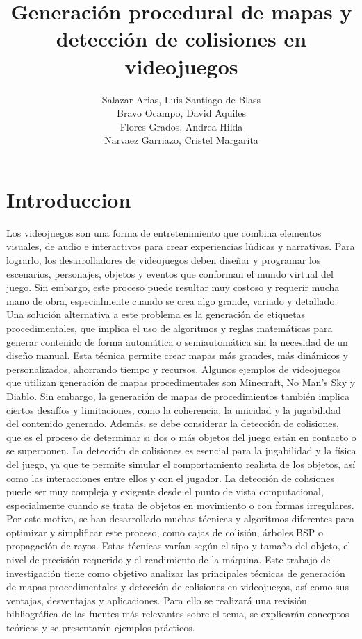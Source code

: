 \documentclass[stu, 12pt, letterpaper, donotrepeattitle, floatsintext, natbib]{apa7}
\title{\Large Generación procedural de mapas y detección de colisiones en videojuegos}
\author{Salazar Arias, Luis Santiago de Blass \\Bravo Ocampo, David Aquiles \\ Flores Grados, Andrea Hilda\\ Narvaez Garriazo, Cristel Margarita} %
\affiliation{\Huge\textbf{Universidad San Ignacio de Loyola}}
\begin{document}
\maketitle


\renewcommand\contentsname{\largeÍndice}
\tableofcontents
\setcounter{tocdepth}{2}
\newpage
\renewcommand{\listfigurename}{\largeÍndice de fíguras}
\listoffigures
\newpage
\renewcommand{\listtablename}{\largeÍndice de tablas}
\listoftables
\newpage


\section{\large Introduccion}
Los videojuegos son una forma de entretenimiento que combina elementos visuales, de audio e 
interactivos para crear experiencias lúdicas y narrativas. Para lograrlo, los desarrolladores de 
videojuegos deben diseñar y programar los escenarios, personajes, objetos y eventos que 
conforman el mundo virtual del juego. Sin embargo, este proceso puede resultar muy costoso y 
requerir mucha mano de obra, especialmente cuando se crea algo grande, variado y detallado. 
Una solución alternativa a este problema es la generación de etiquetas procedimentales, que 
implica el uso de algoritmos y reglas matemáticas para generar contenido de forma automática 
o semiautomática sin la necesidad de un diseño manual. Esta técnica permite crear mapas más 
grandes, más dinámicos y personalizados, ahorrando tiempo y recursos. Algunos ejemplos de 
videojuegos que utilizan generación de mapas procedimentales son Minecraft, No Man's Sky y 
Diablo. Sin embargo, la generación de mapas de procedimientos también implica ciertos desafíos 
y limitaciones, como la coherencia, la unicidad y la jugabilidad del contenido generado. Además, 
se debe considerar la detección de colisiones, que es el proceso de determinar si dos o más 
objetos del juego están en contacto o se superponen. La detección de colisiones es esencial para 
la jugabilidad y la física del juego, ya que te permite simular el comportamiento realista de los 
objetos, así como las interacciones entre ellos y con el jugador. La detección de colisiones puede 
ser muy compleja y exigente desde el punto de vista computacional, especialmente cuando se 
trata de objetos en movimiento o con formas irregulares. Por este motivo, se han desarrollado 
muchas técnicas y algoritmos diferentes para optimizar y simplificar este proceso, como cajas de 
colisión, árboles BSP o propagación de rayos. Estas técnicas varían según el tipo y tamaño del 
objeto, el nivel de precisión requerido y el rendimiento de la máquina. Este trabajo de investigación 
tiene como objetivo analizar las principales técnicas de generación de mapas procedimentales y detección 
de colisiones en videojuegos, así como sus ventajas, desventajas y aplicaciones. Para ello se realizará 
una revisión bibliográfica de las fuentes más relevantes sobre el tema, se explicarán conceptos teóricos 
y se presentarán ejemplos prácticos.\\
\end{document}
